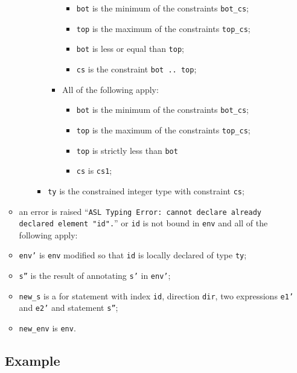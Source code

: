 \documentclass{book}
\begin{document}
\begin{itemize}
\begin{itemize}
\begin{itemize}
\begin{itemize}
\begin{itemize}
                 \begin{itemize}
                   \item \texttt{bot} is the minimum of the constraints \texttt{bot\_cs};
                   \item \texttt{top} is the maximum of the constraints \texttt{top\_cs};
                   \item \texttt{bot} is less or equal than \texttt{top};
                   \item \texttt{cs} is the constraint \texttt{bot .. top};
                 \end{itemize}
               \item All of the following apply:
                 \begin{itemize}
                   \item \texttt{bot} is the minimum of the constraints \texttt{bot\_cs};
                   \item \texttt{top} is the maximum of the constraints \texttt{top\_cs};
                   \item \texttt{top} is strictly less than \texttt{bot}
                   \item \texttt{cs} is \texttt{cs1};
                 \end{itemize}
             \end{itemize}
           \item \texttt{ty} is the constrained integer type with constraint \texttt{cs};
         \end{itemize}
     \end{itemize}
   \item an error is raised ``\texttt{ASL Typing Error: cannot declare already \\ declared element "id".}'' or \texttt{id} is not bound in \texttt{env} and all of the following apply:
   \item \texttt{env'} is \texttt{env} modified so that \texttt{id} is locally declared of type \texttt{ty};
   \item \texttt{s''} is the result of annotating \texttt{s'} in \texttt{env'};
   \item \texttt{new\_s} is a for statement with index \texttt{id}, direction \texttt{dir}, two expressions \texttt{e1'} and \texttt{e2'} and statement \texttt{s''};
   \item \texttt{new\_env} is \texttt{env}.
   \end{itemize}

  \subsection{Example}



\end{itemize}
\end{document}
